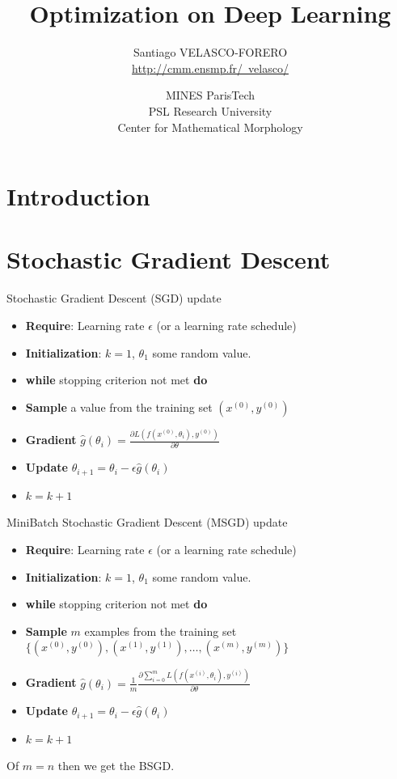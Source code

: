 \documentclass[xcolor=pdftex,dvipsnames,table,mathserif]{beamer}
\title{Optimization on Deep Learning}
\author{Santiago VELASCO-FORERO \\ \href{http://cmm.ensmp.fr/~velasco/}{http://cmm.ensmp.fr/~velasco/}}
\date{MINES ParisTech\\
  PSL Research University\\
  Center for Mathematical Morphology
}
\begin{document}
\begin{frame}
\titlepage
\end{frame}



\section{Introduction}


\section{Stochastic Gradient Descent}

\begin{frame}{Stochastic Gradient Descent (SGD) update}
\begin{itemize}
\item \textbf{Require}: Learning rate $\epsilon$ (or a learning rate schedule)
\item \textbf{Initialization}: $k=1$, $\theta_1$ some random value.
\item \textbf{while} stopping criterion not met \textbf{do}
\item \quad\quad\quad\textbf{Sample} a value from the training set $(x^{(0)},y^{(0)})$
\item \quad\quad\quad\textbf{Gradient} $\hat{g}(\theta_{i}) =\frac{\partial  L(f(x^{(0)},\theta_i),y^{(0)})}{ \partial{\theta}}$
\item \quad\quad\quad\textbf{Update} $\theta_{i+1}= \theta_{i}-\epsilon \hat{g}(\theta_{i})$
\item \quad\quad\quad\textbf{} $k=k+1$
\end{itemize}
\end{frame}

\begin{frame}{MiniBatch Stochastic Gradient Descent (MSGD) update}
\begin{itemize}
\item \textbf{Require}: Learning rate $\epsilon$ (or a learning rate schedule)
\item \textbf{Initialization}: $k=1$, $\theta_1$ some random value.
\item \textbf{while} stopping criterion not met \textbf{do}
\item \quad\quad\quad\textbf{Sample} $m$ examples from the training set $\{ (x^{(0)},y^{(0)}),(x^{(1)},y^{(1)}),\ldots,(x^{(m)},y^{(m)})\}$
\item \quad\quad\quad\textbf{Gradient} $\hat{g}(\theta_{i}) =\frac{1}{m}\frac{\partial  \sum_{i=0}^{m}L(f(x^{(i)},\theta_i),y^{(i)})}{ \partial{\theta}}$
\item \quad\quad\quad\textbf{Update} $\theta_{i+1}= \theta_{i}-\epsilon \hat{g}(\theta_{i})$
\item \quad\quad\quad\textbf{} $k=k+1$
\end{itemize}
Of $m=n$ then we get the BSGD.
\end{frame}
\end{document}
